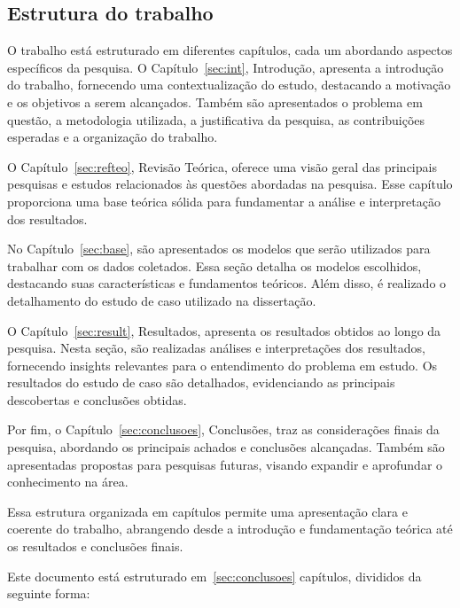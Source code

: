 \subsection{Estrutura do trabalho} \label{subsec:estrutura}



O trabalho está estruturado em diferentes capítulos, cada um abordando aspectos específicos da pesquisa. 
O Capítulo~\ref{sec:int}, Introdução, apresenta a introdução do trabalho, fornecendo uma contextualização do estudo, destacando a motivação e os objetivos a serem alcançados. Também são apresentados o problema em questão, a metodologia utilizada, a justificativa da pesquisa, as contribuições esperadas e a organização do trabalho.

O Capítulo~\ref{sec:refteo}, Revisão Teórica, oferece uma visão geral das principais pesquisas e estudos relacionados às questões abordadas na pesquisa. Esse capítulo proporciona uma base teórica sólida para fundamentar a análise e interpretação dos resultados.

No Capítulo~\ref{sec:base}, são apresentados os modelos que serão utilizados para trabalhar com os dados coletados. Essa seção detalha os modelos escolhidos, destacando suas características e fundamentos teóricos. Além disso, é realizado o detalhamento do estudo de caso utilizado na dissertação.

O Capítulo~\ref{sec:result}, Resultados, apresenta os resultados obtidos ao longo da pesquisa. Nesta seção, são realizadas análises e interpretações dos resultados, fornecendo insights relevantes para o entendimento do problema em estudo. Os resultados do estudo de caso são detalhados, evidenciando as principais descobertas e conclusões obtidas.

Por fim, o Capítulo~\ref{sec:conclusoes}, Conclusões, traz as considerações finais da pesquisa, abordando os principais achados e conclusões alcançadas. Também são apresentadas propostas para pesquisas futuras, visando expandir e aprofundar o conhecimento na área.

Essa estrutura organizada em capítulos permite uma apresentação clara e coerente do trabalho, abrangendo desde a introdução e fundamentação teórica até os resultados e conclusões finais.

 Este documento está estruturado em~\ref{sec:conclusoes} capítulos, divididos da seguinte forma:

